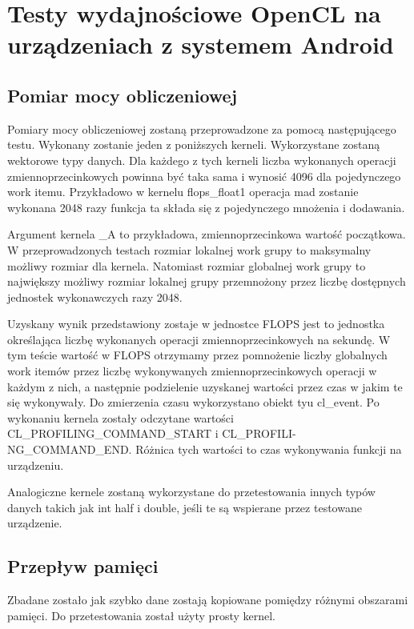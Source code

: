 \section[Testy wydajnościowe OpenCL na urządzeniach z systemem Android]{Testy wydajnościowe OpenCL na urządzeniach z systemem Android}

\subsection[Pomiar mocy obliczeniowej]{Pomiar mocy obliczeniowej}
Pomiary mocy obliczeniowej zostaną przeprowadzone za pomocą następującego testu.
Wykonany zostanie jeden z poniższych kerneli. Wykorzystane zostaną wektorowe typy danych. Dla każdego z tych kerneli liczba wykonanych operacji zmiennoprzecinkowych powinna być taka sama i wynosić 4096 dla pojedynczego work itemu. Przykładowo w kernelu flops\_float1 operacja mad zostanie wykonana 2048 razy funkcja ta składa się z pojedynczego mnożenia i dodawania.

Argument kernela \_A to przykładowa, zmiennoprzecinkowa wartość początkowa. W przeprowadzonych testach rozmiar lokalnej work grupy to maksymalny możliwy rozmiar dla kernela. Natomiast rozmiar globalnej work grupy to największy możliwy rozmiar lokalnej grupy przemnożony przez liczbę dostępnych jednostek wykonawczych razy 2048.

Uzyskany wynik przedstawiony zostaje w jednostce FLOPS jest to jednostka określająca liczbę wykonanych operacji zmiennoprzecinkowych na sekundę. W tym teście wartość w FLOPS otrzymamy przez pomnożenie liczby globalnych work itemów przez liczbę wykonywanych zmiennoprzecinkowych operacji w każdym z nich, a następnie podzielenie uzyskanej wartości przez czas w jakim te się wykonywały. Do zmierzenia czasu wykorzystano obiekt tyu cl\_event. Po wykonaniu kernela zostały odczytane wartości CL\_PROFILING\_COMMAND\_START i CL\_PROFILI- NG\_COMMAND\_END. Różnica tych wartości to czas wykonywania funkcji na urządzeniu.

Analogiczne kernele zostaną wykorzystane do przetestowania innych typów danych takich jak int half i double, jeśli te są wspierane przez testowane urządzenie.

\subsection[Przepływ pamięci]{Przepływ pamięci}
Zbadane zostało jak szybko dane zostają kopiowane pomiędzy różnymi obszarami pamięci. Do przetestowania został użyty prosty kernel.

